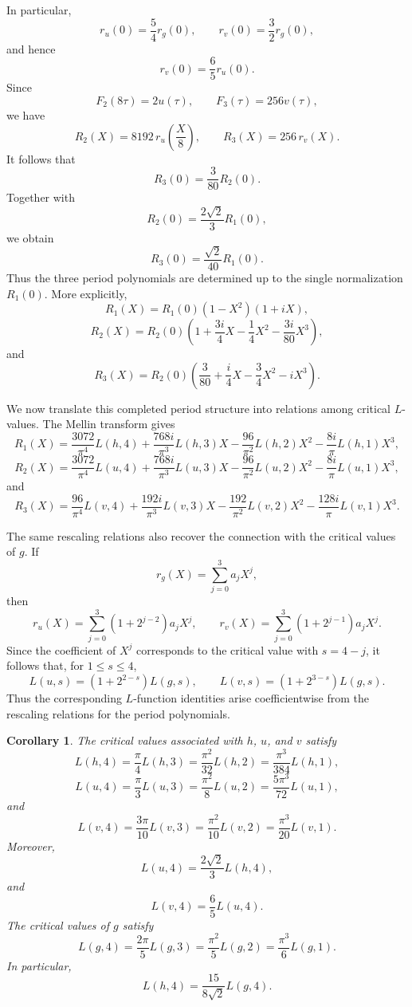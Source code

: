 \documentclass[preprint,12pt]{elsarticle}
\newtheorem{corollary}[theorem]{Corollary}
\theoremstyle{definition}
\theoremstyle{remark}
\begin{document}
In particular,
\[
r_u(0)=\frac{5}{4}r_g(0),\qquad r_v(0)=\frac{3}{2}r_g(0),
\]
and hence
\[
r_v(0)=\frac{6}{5}r_u(0).
\]
Since
\[
F_2(8\tau)=2u(\tau),\qquad F_3(\tau)=256v(\tau),
\]
we have
\[
R_2(X)=8192\,r_u\left(\frac{X}{8}\right),\qquad R_3(X)=256\,r_v(X).
\]
It follows that
\[
R_3(0)=\frac{3}{80}R_2(0).
\]
Together with
\[
R_2(0)=\frac{2\sqrt{2}}{3}R_1(0),
\]
we obtain
\[
R_3(0)=\frac{\sqrt{2}}{40}R_1(0).
\]
Thus the three period polynomials are determined up to the single normalization $R_1(0)$.  More explicitly,
\[
R_1(X)=R_1(0)(1-X^2)(1+iX),
\]
\[
R_2(X)=R_2(0)\left(1+\frac{3i}{4}X-\frac{1}{4}X^2-\frac{3i}{80}X^3\right),
\]
and
\[
R_3(X)=R_2(0)\left(\frac{3}{80}+\frac{i}{4}X-\frac{3}{4}X^2-iX^3\right).
\]

We now translate this completed period structure into relations among critical $L$-values.  The Mellin transform gives
\[
R_1(X)=\frac{3072}{\pi^4}L(h,4)+\frac{768i}{\pi^3}L(h,3)X-\frac{96}{\pi^2}L(h,2)X^2-\frac{8i}{\pi}L(h,1)X^3,
\]
\[
R_2(X)=\frac{3072}{\pi^4}L(u,4)+\frac{768i}{\pi^3}L(u,3)X-\frac{96}{\pi^2}L(u,2)X^2-\frac{8i}{\pi}L(u,1)X^3,
\]
and
\[
R_3(X)=\frac{96}{\pi^4}L(v,4)+\frac{192i}{\pi^3}L(v,3)X-\frac{192}{\pi^2}L(v,2)X^2-\frac{128i}{\pi}L(v,1)X^3.
\]

The same rescaling relations also recover the connection with the critical values of $g$.  If
\[
r_g(X)=\sum_{j=0}^3 a_jX^j,
\]
then
\[
r_u(X)=\sum_{j=0}^3\left(1+2^{j-2}\right)a_jX^j,\qquad
r_v(X)=\sum_{j=0}^3\left(1+2^{j-1}\right)a_jX^j.
\]
Since the coefficient of $X^j$ corresponds to the critical value with $s=4-j$, it follows that, for $1\leq s\leq4$,
\[
L(u,s)=\left(1+2^{2-s}\right)L(g,s),\qquad
L(v,s)=\left(1+2^{3-s}\right)L(g,s).
\]
Thus the corresponding $L$-function identities arise coefficientwise from the rescaling relations for the period polynomials.

\begin{corollary}
	The critical values associated with $h$, $u$, and $v$ satisfy
	\[
	L(h,4)=\frac{\pi}{4}L(h,3)=\frac{\pi^2}{32}L(h,2)=\frac{\pi^3}{384}L(h,1),
	\]
	\[
	L(u,4)=\frac{\pi}{3}L(u,3)=\frac{\pi^2}{8}L(u,2)=\frac{5\pi^3}{72}L(u,1),
	\]
	and
	\[
	L(v,4)=\frac{3\pi}{10}L(v,3)=\frac{\pi^2}{10}L(v,2)=\frac{\pi^3}{20}L(v,1).
	\]
	Moreover,
	\[
	L(u,4)=\frac{2\sqrt{2}}{3}L(h,4),
	\]
	and
	\[
	L(v,4)=\frac{6}{5}L(u,4).
	\]
	The critical values of $g$ satisfy
	\[
	L(g,4)=\frac{2\pi}{5}L(g,3)=\frac{\pi^2}{5}L(g,2)=\frac{\pi^3}{6}L(g,1).
	\]
	In particular,
	\[
	L(h,4)=\frac{15}{8\sqrt{2}}L(g,4).
	\]
\end{corollary}
\end{document}
